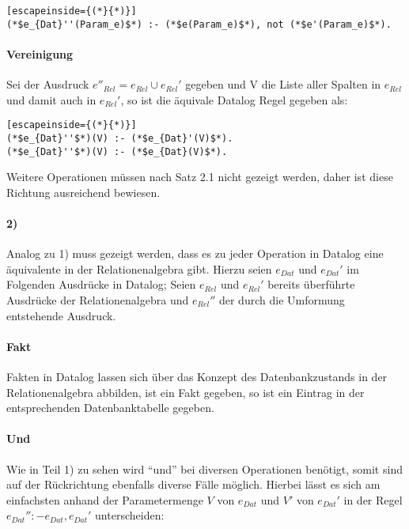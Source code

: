 \documentclass[12pt,a4paper]{amsart}
\begin{document}
\begin{aufgabe1}
\begin{lstlisting}[escapeinside={(*}{*)}]
(*$e_{Dat}''(Param_e)$*) :- (*$e(Param_e)$*), not (*$e'(Param_e)$*).
\end{lstlisting}

\paragraph{\textbf{Vereinigung}}
Sei der Ausdruck $e''_{Rel} = e_{Rel} \cup e_{Rel}'$ gegeben und V die Liste aller Spalten in $e_{Rel}$ und damit auch in $e_{Rel}'$, so ist die äquivale Datalog Regel gegeben als:

\begin{lstlisting}[escapeinside={(*}{*)}]
(*$e_{Dat}''$*)(V) :- (*$e_{Dat}'(V)$*).
(*$e_{Dat}''$*)(V) :- (*$e_{Dat}(V)$*).
\end{lstlisting}

Weitere Operationen müssen nach Satz 2.1 nicht gezeigt werden, daher ist diese Richtung ausreichend bewiesen.

\paragraph{2)}

Analog zu 1) muss gezeigt werden, dass es zu jeder Operation in Datalog eine äquivalente in der Relationenalgebra gibt. Hierzu seien $e_{Dat}$ und $e_{Dat}'$ im Folgenden Ausdrücke in Datalog; Seien $e_{Rel}$ und $e_{Rel}'$ bereits überführte Ausdrücke der Relationenalgebra und $e_{Rel}''$ der durch die Umformung entstehende Ausdruck. \\


\paragraph{\textbf{Fakt}}
Fakten in Datalog lassen sich über das Konzept des Datenbankzustands in der Relationenalgebra abbilden, ist ein Fakt gegeben, so ist ein Eintrag in der entsprechenden Datenbanktabelle gegeben.\\

\paragraph{\textbf{Und}}
Wie in Teil 1) zu sehen wird ``und'' bei diversen Operationen benötigt, somit sind auf der Rückrichtung ebenfalls diverse Fälle möglich. Hierbei lässt es sich am einfachsten anhand der Parametermenge $V$ von $e_{Dat}$ und $V'$ von $e_{Dat}'$ in der Regel $e_{Dat}'' :- e_{Dat}, e_{Dat}'$ unterscheiden:


\end{aufgabe1}
\end{document}
